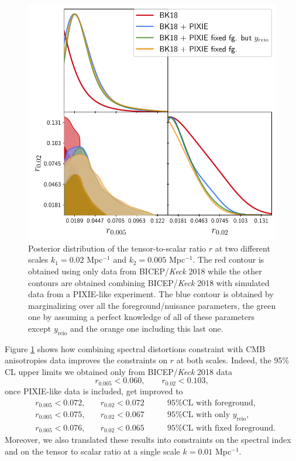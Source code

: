 \begin{figure}[t]
        \centering
        \includegraphics[width=.75\textwidth]{Constraints/BKPIXIE.pdf}
        \caption{Posterior distribution of the tensor-to-scalar ratio $r$ at two different scales $k_1=0.02$ Mpc$^{-1}$ and $k_2=0.005$ Mpc$^{-1}$. The red contour is obtained using only data from BICEP/\textit{Keck} 2018 \cite{Ade_2021} while the other contours are obtained combining BICEP/\textit{Keck} 2018 with simulated data from a PIXIE-like experiment. The blue contour is obtained by marginalizing over all the foreground/nuisance parameters, the green one by assuming a perfect knowledge of all of these parameters except $y_\text{reio}$ and the orange one including this last one.}
        \label{fig:r_const}        
    \end{figure}
Figure \ref{fig:r_const} shows how combining spectral distortions constraint with CMB anisotropies data improves the constraints on $r$ at both scales. Indeed, the 95\% CL upper limits we obtained only from BICEP/\textit{Keck} 2018 data
$$r_{0.005}<0.060,\qquad r_{0.02}<0.103,$$
once PIXIE-like data is included, get improved to 
\begin{align*}
    &r_{0.005}<0.072,\quad &r_{0.02}<0.072\qquad&\text{95\%CL with foreground,}\\
    &r_{0.005}<0.075,\quad &r_{0.02}<0.067\qquad&\text{95\%CL with only $y_{\text{reio}}$,}\\
    &r_{0.005}<0.076,\quad &r_{0.02}<0.065\qquad&\text{95\%CL with fixed foreground}.
\end{align*}
Moreover, we also translated these results into constraints on the spectral index and on the tensor to scalar ratio at a single scale $k=0.01$ Mpc$^{-1}$. 
